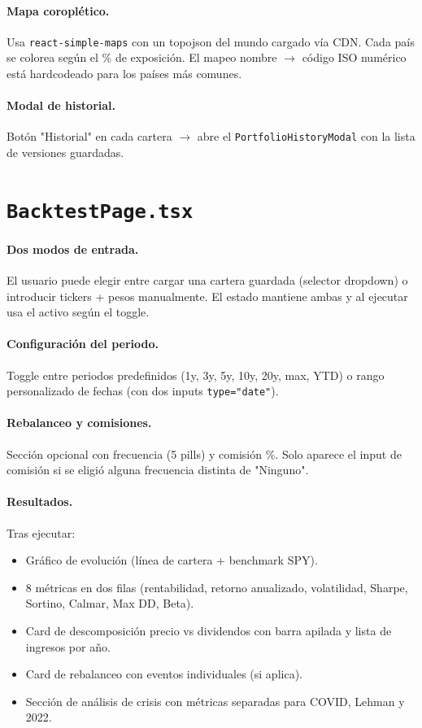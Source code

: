 \documentclass[11pt,a4paper]{book}
\begin{document}
\paragraph{Mapa coroplético.} Usa \texttt{react-simple-maps} con un topojson del mundo cargado vía CDN. Cada país se colorea según el \% de exposición. El mapeo nombre $\to$ código ISO numérico está hardcodeado para los países más comunes.

\paragraph{Modal de historial.} Botón "Historial" en cada cartera $\to$ abre el \texttt{PortfolioHistoryModal} con la lista de versiones guardadas.

\section{\texttt{BacktestPage.tsx}}

\paragraph{Dos modos de entrada.} El usuario puede elegir entre cargar una cartera guardada (selector dropdown) o introducir tickers + pesos manualmente. El estado mantiene ambas y al ejecutar usa el activo según el toggle.

\paragraph{Configuración del periodo.} Toggle entre periodos predefinidos (1y, 3y, 5y, 10y, 20y, max, YTD) o rango personalizado de fechas (con dos inputs \texttt{type="date"}).

\paragraph{Rebalanceo y comisiones.} Sección opcional con frecuencia (5 pills) y comisión \%. Solo aparece el input de comisión si se eligió alguna frecuencia distinta de "Ninguno".

\paragraph{Resultados.} Tras ejecutar:
\begin{itemize}
  \item Gráfico de evolución (línea de cartera + benchmark SPY).
  \item 8 métricas en dos filas (rentabilidad, retorno anualizado, volatilidad, Sharpe, Sortino, Calmar, Max DD, Beta).
  \item Card de descomposición precio vs dividendos con barra apilada y lista de ingresos por año.
  \item Card de rebalanceo con eventos individuales (si aplica).
  \item Sección de análisis de crisis con métricas separadas para COVID, Lehman y 2022.
\end{itemize}
\end{document}
